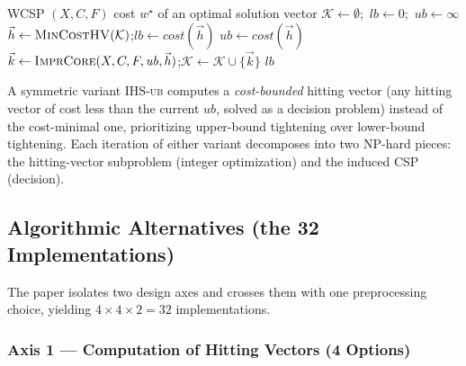 \begin{algorithm}[t]
\caption{Baseline IHS for WCSP (\textsc{IHS-lb}). $\textsc{MinCostHV}(\mathcal{K})$ returns a minimum-cost hitting vector; $\textsc{ImprCore}$ improves a hitting vector that is a core into a larger core.}
\label{alg:ihs-lb}
\begin{algorithmic}[1]
\Require WCSP $(X, C, F)$
\Ensure cost $w^\star$ of an optimal solution vector
\State $\mathcal{K} \gets \emptyset$;\ $\mathit{lb} \gets 0$;\ $\mathit{ub} \gets \infty$
  \State $\vec{h} \gets \textsc{MinCostHV}(\mathcal{K})$;\quad $\mathit{lb} \gets \mathit{cost}(\vec{h})$
      \State $\mathit{ub} \gets \mathit{cost}(\vec{h})$
  \Else
      \State $\vec{k} \gets \textsc{ImprCore}(X, C, F, \mathit{ub}, \vec{h})$;\quad $\mathcal{K} \gets \mathcal{K} \cup \{\vec{k}\}$
  \EndIf
\EndWhile
\State \Return $\mathit{lb}$
\end{algorithmic}
\end{algorithm}

A symmetric variant \textsc{IHS-ub} computes a \emph{cost-bounded} hitting
vector (any hitting vector of cost less than the current $\mathit{ub}$,
solved as a decision problem) instead of the cost-minimal one, prioritizing
upper-bound tightening over lower-bound tightening. Each iteration of either
variant decomposes into two NP-hard pieces: the hitting-vector subproblem
(integer optimization) and the induced CSP (decision).

\subsection{Algorithmic Alternatives (the 32 Implementations)}
\label{sec:alts}

The paper isolates two design axes and crosses them with one preprocessing
choice, yielding $4 \times 4 \times 2 = 32$ implementations.

\subsubsection{Axis 1 --- Computation of Hitting Vectors (4 Options)}

